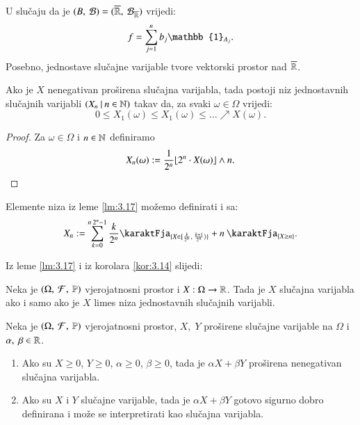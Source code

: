 \begin{pr}  \label{pr:3.16}    
    U slu\v caju da je $(B, \: \mathcal{B}) = (\overline{\mathbb{R}}, \: \mathcal{B}_{\overline{\mathbb{R}}})$ vrijedi:
    \begin{equation*}
        f = \suma{j = 1}{n} b_j \mathbb{1}_{A_j}.
    \end{equation*}
    Posebno, jednostave slu\v cajne varijable tvore vektorski prostor nad $\overline{\mathbb{R}}$.
\end{pr}

\begin{lm}  \label{lm:3.17}
    Ako je $X$ nenegativan pro\v sirena slu\v cajna varijabla, tada postoji niz jednostavnih slu\v cajnih varijabli $({X_n} \: | \: {n \in \mathbb{N}})$ takav da, za svaki $\omega \in \Omega$ vrijedi:
    \begin{equation*}
        0 \leq X_1(\omega) \leq X_1(\omega) \leq  \dots \nearrow X(\omega).
    \end{equation*} 
\end{lm}

\begin{proof}
    Za $\omega \in \Omega$ i $n \in \mathbb{N}$ definiramo
    \begin{equation*}
        X_n(\omega) := \frac{1}{2^n} \floor*{2^n \cdot X(\omega)} \land n.
    \end{equation*}
\end{proof}

\begin{nap} \label{nap:3.17-1}
    Elemente niza iz leme \ref{lm:3.17} mo\v zemo definirati i sa:
    \begin{equation*}
        X_n := \suma{k = 0}{n \: 2^n - 1} \frac{k}{2^n} \karaktFja_{\{ X \in \desInt{\frac{k}{2^n}}{\frac{k + 1}{2^n}} \}} + n \: \karaktFja_{\{X \geq n\}}.
    \end{equation*}
\end{nap}

Iz leme \ref{lm:3.17} i iz korolara \ref{kor:3.14} slijedi:

\begin{tm}  \label{tm:3.18}
    Neka je $(\Omega, \: \mathcal{F}, \: \mathbb{P})$ vjerojatnosni prostor i $X: \Omega \to \mathbb{R}$. Tada je $X$ slu\v cajna varijabla ako i samo ako je $X$ limes niza jednostavnih slu\v cajnih varijabli.
\end{tm}

\begin{zad} \label{zad:3.19}
    Neka je $(\Omega, \: \mathcal{F}, \: \mathbb{P})$ vjerojatnosni prostor, $X, \; Y$ pro\v sirene slu\v cajne varijable na $\Omega$ i $\alpha, \; \beta \in \mathbb{R}$.
    \begin{enumerate}[label=(\alph*)]
        \item Ako su $X \geq 0$, $Y \geq 0$, $\alpha \geq 0$, $\beta    \geq 0$, tada je $\alpha X + \beta Y$ pro\v sirena nenegativan slu\v cajna varijabla.
        \item Ako su $X$ i $Y$ slu\v cajne  varijable, tada je $\alpha X + \beta Y$ gotovo sigurno dobro definirana i mo\v ze se interpretirati kao slu\v cajna varijabla.
    \end{enumerate}
\end{zad}

